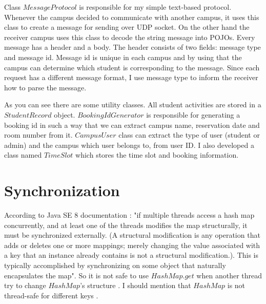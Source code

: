 \documentclass[12pt]{article}
\begin{document}
\par Class $MessageProtocol$ is responsible for my simple text-based protocol. Whenever the campus decided to communicate with another campus, it uses this class to create a message for sending over UDP socket. On the other hand the receiver campus uses this class to decode the string message into POJOs. Every message has a header and a body. The header consists of two fields: message type and message id. Message id is unique in each campus and by using that the campus can determine which student is corresponding to the message. Since each request has a different message format, I use message type to inform the receiver how to parse the message. 
\par As you can see there are some utility classes. All student activities are stored in a $StudentRecord$ object. $BookingIdGenerator$ is responsible for generating a booking id in such a way that we can extract campus name, reservation date and room number from it. $CampusUser$ class can extract the type of user (student or admin) and the campus which user belongs to, from user ID. I also developed a class named $TimeSlot$ which stores the time slot and booking information.

\section{Synchronization}
According to Java SE 8 documentation \cite{hashmap}: "if multiple threads access a hash map concurrently, and at least one of the threads modifies the map structurally, it must be synchronized externally. (A structural modification is any operation that adds or deletes one or more mappings; merely changing the value associated with a key that an instance already contains is not a structural modification.). This is typically accomplished by synchronizing on some object that naturally encapsulates the map". So it is not safe to use $HashMap.get$ when another thread try to change $HashMap$'s structure \cite{hashmap-multithread-get}. I should mention that $HashMap$ is not thread-safe for different keys \cite{hashmap-multithread-different-keys}.
\end{document}
